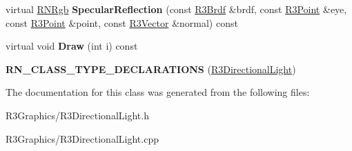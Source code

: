 \begin{DoxyCompactItemize}
\item 
virtual \hyperlink{class_r_n_rgb}{R\+N\+Rgb} {\bfseries Specular\+Reflection} (const \hyperlink{class_r3_brdf}{R3\+Brdf} \&brdf, const \hyperlink{class_r3_point}{R3\+Point} \&eye, const \hyperlink{class_r3_point}{R3\+Point} \&point, const \hyperlink{class_r3_vector}{R3\+Vector} \&normal) const \hypertarget{class_r3_directional_light_a6753359b3f43ab8f5964b2b7a0ab8522}{}\label{class_r3_directional_light_a6753359b3f43ab8f5964b2b7a0ab8522}

\item 
virtual void {\bfseries Draw} (int i) const \hypertarget{class_r3_directional_light_a8a18993a1898af3fc05ffc78a7c469c1}{}\label{class_r3_directional_light_a8a18993a1898af3fc05ffc78a7c469c1}

\item 
{\bfseries R\+N\+\_\+\+C\+L\+A\+S\+S\+\_\+\+T\+Y\+P\+E\+\_\+\+D\+E\+C\+L\+A\+R\+A\+T\+I\+O\+NS} (\hyperlink{class_r3_directional_light}{R3\+Directional\+Light})\hypertarget{class_r3_directional_light_a6fbdaa386aeb812baa309038766993dc}{}\label{class_r3_directional_light_a6fbdaa386aeb812baa309038766993dc}

\end{DoxyCompactItemize}


The documentation for this class was generated from the following files\+:\begin{DoxyCompactItemize}
\item 
R3\+Graphics/R3\+Directional\+Light.\+h\item 
R3\+Graphics/R3\+Directional\+Light.\+cpp\end{DoxyCompactItemize}
